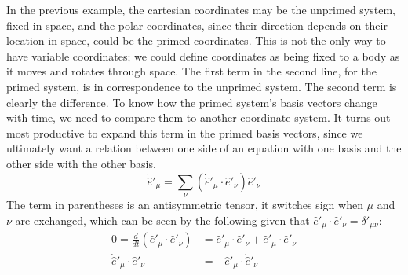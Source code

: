 \documentclass[10pt]{article}
\begin{document}
In the previous example, the cartesian coordinates may be the unprimed 
system, fixed 
in space, and the polar coordinates, since their direction depends on their 
location in space, could be the primed coordinates. This is not the only way 
to have variable coordinates; we could define coordinates as being fixed to 
a body as it moves and rotates through space. The first term in the 
second line, for the primed system, is in correspondence 
to the unprimed system. The second term is clearly the difference.
To know how the primed system's basis vectors change with time, 
we need to compare them to another coordinate system. It turns out most 
productive to expand this term in the primed basis vectors, since 
we ultimately want a relation between one side of an equation with 
one basis and the other side with the other basis.
\begin{equation}
    \dot{\hat{e}}'_\mu = \sum_\nu 
        \left(\dot{\hat{e}}'_\mu\cdot\hat{e}'_\nu\right)\hat{e}'_\nu
\end{equation}
The term in parentheses is an antisymmetric tensor, it switches sign when 
$\mu$ and $\nu$ are exchanged, which can be seen by 
the following given that $\hat{e}'_\mu\cdot\hat{e}'_\nu = \delta'_{\mu\nu}$:
\begin{align*}
    0 = \frac{d}{dt}\left(\hat{e}'_\mu\cdot\hat{e}'_\nu\right) &= 
        \dot{\hat{e}}'_\mu\cdot\hat{e}'_\nu + 
        \hat{e}'_\mu\cdot\dot{\hat{e}}'_\nu \\
    \dot{\hat{e}}'_\mu\cdot\hat{e}'_\nu &= -\hat{e}'_\mu\cdot\dot{\hat{e}}'_\nu
\end{align*}
\end{document}

